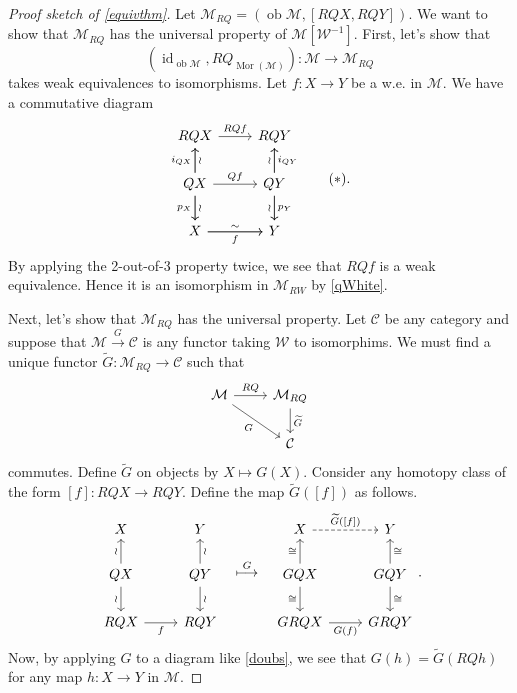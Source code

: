 \documentclass[10pt,letterpaper,cm]{nupset}
\theoremstyle{definition}
\theoremstyle{theorem}
\theoremstyle{remark}
\newcommand{\1}{\mathbb{1}}
\renewcommand{\c}{\mathcal{C}}
\newcommand{\m}{\mathcal{M}}
\newcommand{\w}{\mathscr{W}}
\newcommand{\0}{\vec 0}
\DeclareMathOperator{\id}{id}
\DeclareMathOperator{\ob}{ob}
\DeclareMathOperator{\mor}{Mor}
\begin{document}
\smallskip

\begin{proof}[Proof sketch of \cref{equivthm}]
Let $\m_{RQ} =  \left(\ob{\m},  \left[RQ{X}, RQ{Y}\right]\right)$. We want to show that $\m_{RQ}$ has the universal property of $\m\left[\w^{-1}\right]$. First, let's show that 
\[
\left(\id_{\ob{\m}}, RQ_{\mor(\m)}\right) : \m \longrightarrow \m_{RQ}
\] takes weak equivalences to isomorphisms. Let $f: X \to Y$ be a w.e. in $\m$. We have a commutative diagram
\[ \label{doubs}
\begin{tikzcd}
	{RQ{X}} & {RQ{Y}} \\
	{Q{X}} & {Q{Y}} \\
	X & Y
	\arrow["{Q{f}}", from=2-1, to=2-2]
	\arrow["f"', from=3-1, to=3-2]
	\arrow["{p_X}"', from=2-1, to=3-1]
	\arrow["{p_Y}", from=2-2, to=3-2]
	\arrow["{RQ{f}}", from=1-1, to=1-2]
	\arrow["{i_{QX}}", from=2-1, to=1-1]
	\arrow["{i_{Q{Y}}}"', from=2-2, to=1-2]
	\arrow["\wr"', from=2-2, to=3-2]
	\arrow["\wr", from=2-1, to=3-1]
	\arrow["\sim", from=3-1, to=3-2]
	\arrow["\wr"', from=2-1, to=1-1]
	\arrow["\wr", from=2-2, to=1-2]
\end{tikzcd} \tag{$\ast$}
.\] By applying the 2-out-of-3 property twice, we see that $RQ{f}$ is a weak equivalence. Hence it is an isomorphism in $\m_{RW}$ by  \cref{qWhite}.

\medskip

Next, let's show that $\m_{RQ}$ has the universal property. Let $\c$ be any category and suppose that $\m \xrightarrow{G} \c$ is any functor taking $\w$ to isomorphims. We must find a unique functor $\widetilde{G} : \m_{RQ} \to \c$ such that 
\[
\begin{tikzcd}
	\m & {\m_{RQ}} \\
	& \c
	\arrow["G"', from=1-1, to=2-2]
	\arrow["RQ", from=1-1, to=1-2]
	\arrow["{\widetilde{G}}", from=1-2, to=2-2]
\end{tikzcd}
\]  commutes. Define $\widetilde{G}$ on objects by $X \mapsto G(X)$.   Consider any homotopy class of the form $\left[f\right] : RQ{X} \to RQ{Y}$. Define the map $\widetilde{G}(\left[f\right])$ as follows.
\[
\begin{tikzcd}
	X & Y \\
	{Q{X}} & {Q{Y}} \\
	{RQ{X}} & {RQ{Y}}
	\arrow["\wr", from=2-1, to=1-1]
	\arrow["\wr"', from=2-1, to=3-1]
	\arrow["f"', from=3-1, to=3-2]
	\arrow["\wr", from=2-2, to=3-2]
	\arrow["\wr"', from=2-2, to=1-2]
\end{tikzcd}
\ \ \overset{G}{\longmapsto}  \ \
\begin{tikzcd}
	X & Y \\
	{GQ{X}} & {GQ{Y}} \\
	{GRQ{X}} & {GRQ{Y}}
	\arrow["\cong", from=2-1, to=1-1]
	\arrow["\cong"', from=2-1, to=3-1]
	\arrow["{G(f)}"', from=3-1, to=3-2]
	\arrow["\cong", from=2-2, to=3-2]
	\arrow["\cong"', from=2-2, to=1-2]
	\arrow["{\widetilde{G}(\left[f\right])}", dashed, from=1-1, to=1-2]
\end{tikzcd}
.\]
Now, by applying $G$ to a diagram like \eqref{doubs}, we see that $G(h) = \widetilde{G}(RQ{h})$ for any map $h : X \to Y$ in $\m$.


\end{proof}
\end{document}
